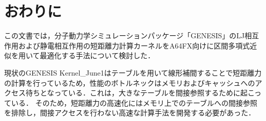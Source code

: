 \documentclass[uplatex,11pt,a4j,titlepage,oneside,openright,dvipdfmx]{jsbook}
\begin{document}


\chapter{おわりに}
この文書では，分子動力学シミュレーションパッケージ「GENESIS」のLJ相互作用および静電相互作用の短距離力計算カーネルをA64FX向けに区間多項式近似を用いて最適化する手法について検討した．

現状のGENESIS Kernel\_June1はテーブルを用いて線形補間することで短距離力の計算を行っているため，性能のボトルネックはメモリおよびキャッシュへのアクセス待ちとなっている．これは，大きなテーブルを間接参照するために起こっている．
そのため，短距離力の高速化にはメモリ上でのテーブルへの間接参照を排除し，間接アクセスを行わない高速な計算手法を開発する必要があった．
\end{document}
